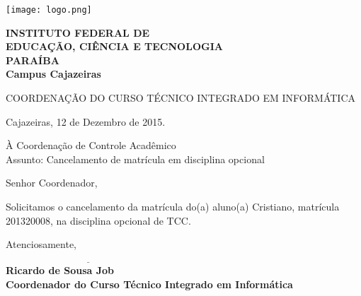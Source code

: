 


\hspace{1.4cm}
\begin{minipage}{.19\textwidth}
    \texttt{[image: logo.png]}
\end{minipage}
\begin{minipage}[t]{\textwidth}
    \vspace{.001cm}
    {\bf
        {\selectfont
            INSTITUTO FEDERAL DE\\
            EDUCAÇÃO, CIÊNCIA E TECNOLOGIA\\
            {\color{green}
                \uppercase{Paraíba}\\
                Campus Cajazeiras
            }
        }
    }
\end{minipage}

{\bf {\selectfont
    \begin{center} {\selectfont
		COORDENAÇÃO DO \uppercase{Curso Técnico Integrado em Informática}
    } \end{center}
} }

\begin{flushright} Cajazeiras, 12 de Dezembro de 2015. \end{flushright}

\noindent À Coordenação de Controle Acadêmico\\
Assunto: Cancelamento de matrícula em disciplina opcional

\noindent Senhor Coordenador,

\onehalfspacing Solicitamos o cancelamento da matrícula do(a) aluno(a) Cristiano,
				matrícula 201320008, na disciplina opcional de TCC.

\noindent Atenciosamente,

{\bf
	\indent $\underline{\hspace{7cm}}$\\
	\indent Ricardo de Sousa Job\\
	\indent Coordenador do Curso Técnico Integrado em Informática\\
}


